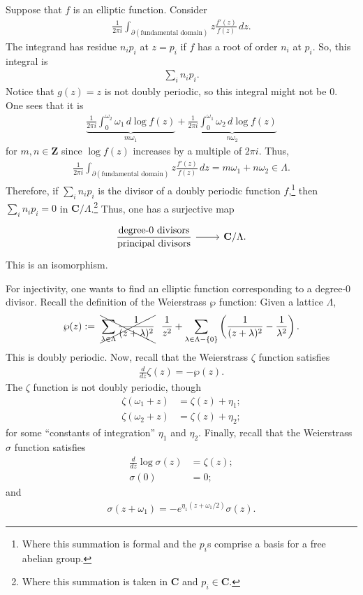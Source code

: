 \documentclass [11 pt, oneside] {article}
\begin{document}
Suppose that $f$ is an elliptic function. Consider
\begin{align*}
	\frac{1}{2\pi i}\int_{\partial(\textrm{fundamental domain})}^{} z\frac{f' (z)}{f(z)}  \, dz. 
\end{align*}
The integrand has residue $n_ip_i$ at $z=p_i$ if $f$ has a root of order $n_i$ at $p_i$. So, this integral is 
\begin{align*}
	\sum_{i}^{} n_ip_i.
\end{align*}
Notice that $g(z)=z$ is not doubly periodic, so this integral might not be $0$. One sees that it is
\begin{align*}
	\underbrace{\frac{1}{2\pi i}\int_{0}^{\omega_2} \omega_1  \, d\log f (z)}_{m\omega_1} + \underbrace{\frac{1}{2\pi i} \int_{0}^{\omega_1} \omega_2  \, d\log f(z)}_{n\omega_2}  
\end{align*}
for $m,n\in \mathbf{Z}$ since $\log f(z)$ increases by a multiple of $2\pi i$.
Thus,
\begin{align*}
	\frac{1}{2\pi i} \int_{\partial(\textrm{fundamental domain})}^{} z \frac{f'(z)}{f(z)} \, dz=m\omega_1+n\omega_2 \in \Lambda. 
\end{align*}
Therefore, if $\sum_{i}^{} n_ip_i$ is the divisor of a doubly periodic function $f$,\footnote{Where this summation is formal and the $p_i$s comprise a basis for a free abelian group.} then $\sum_{i}^{} n_ip_i=0$ in $\mathbf{C}/\Lambda$.\footnote{Where this summation is taken in $\mathbf{C}$ and $p_i\in \mathbf{C}$.}
Thus, one has a surjective map
\[
\begin{tikzcd}
	\displaystyle\frac{\textrm{degree-$0$ divisors}}{\textrm{principal divisors}} \ar[r]&\mathbf{C}/\Lambda.
\end{tikzcd}
\]
This is an isomorphism.

For injectivity, one wants to find an elliptic function corresponding to a degree-$0$ divisor. Recall the definition of the Weierstrass $\wp$ function: Given a lattice $\Lambda$,
 \begin{align*}
	\wp(z) := \ \xcancel{\sum_{\lambda\in\Lambda}^{} \frac{1}{(z+\lambda) ^2}}\ \ \frac{1}{z^2}+\sum_{\lambda\in \Lambda-\{0\}}^{} \left( \frac{1}{(z+\lambda) ^2}-\frac{1}{\lambda^2} \right) .
\end{align*}
This is doubly periodic. Now, recall that the Weierstrass $\zeta$ function satisfies
\begin{align*}
	\frac{d}{dz}\zeta(z) = -\wp (z).
\end{align*}
The $\zeta$ function is not doubly periodic, though
\begin{align*}
	\zeta(\omega_1+z) &= \zeta(z)+\eta_1;\\
	\zeta(\omega_2+z)&= \zeta(z)+\eta_2;
\end{align*}
for some ``constants of integration'' $\eta_1$ and $\eta_2$. Finally, recall that the Weierstrass $\sigma$ function satisfies
\begin{align*}
	\frac{d}{dz}\log\sigma(z) &= \zeta (z);\\
	\sigma(0)&=0;
\end{align*}
and
\begin{align*}
	\sigma(z+\omega_1) = -e^{\eta_1(z+\omega_1/2)} \sigma(z).
\end{align*}
\end{document}
